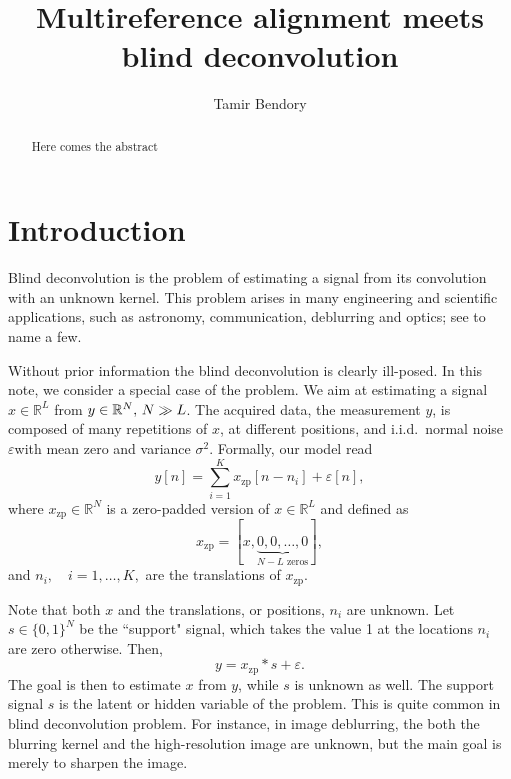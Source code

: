 \documentclass[12pt,a4paper]{article}
\numberwithin{equation}{section}
\numberwithin{figure}{section}
\theoremstyle{plain}
\theoremstyle{definition}
\theoremstyle{remark}
\theoremstyle{plain}
\theoremstyle{remark}
\theoremstyle{plain}
\theoremstyle{plain}
\newcommand{\RL}{\mathbb{R}^L}
\newcommand{\RN}{\mathbb{R}^N}
\newcommand{\xz}{x_{\textrm{zp}}}
\begin{document}


\title{Multireference alignment meets blind deconvolution}
\author{Tamir Bendory}
\maketitle

\begin{abstract}
	Here comes the abstract
\end{abstract}


\section{Introduction} \label{sec:introduction}

Blind deconvolution is the problem of estimating a signal from its convolution with an unknown kernel. This problem arises in many engineering and scientific applications, such as astronomy, communication, deblurring and optics; see   \cite{jefferies1993restoration,tong1994blind,chan1998total,campisi2016blind,kundur1996blind,levin2011understanding,shalvi1990new,levin2009understanding,krishnan2011blind,ayers1988iterative,michaeli2014blind} to name a few.

Without prior information the blind deconvolution is clearly ill-posed. In this note, we consider a special case of the problem. We aim at estimating a signal $x\in\RL$ from $y\in\RN, \thinspace N\gg L$. The acquired data, the measurement $y$, is composed of many repetitions of $x$, at different positions, and i.i.d.\ normal noise $\varepsilon $with mean zero and variance $\sigma^2$. 
Formally, our model read
\begin{equation}
y[n] = \sum_{i=1}^K \xz [n-n_i] + \varepsilon[n], 
\end{equation}
where $\xz\in\RN$ is a zero-padded version of $x\in\RL$ and 
defined as $$\xz  = [x, \underbrace{0,0,\ldots,0}_{N-L \text{ zeros}}],$$ and
 $n_i,\quad i=1,\ldots,K,$ are the translations of $\xz$.


Note that both $x$ and the translations, or positions, $n_i$ are unknown. Let $s\in\{0,1\}^N$ be the ``support" signal, which takes the value 1 at the locations $n_i$ are zero otherwise. 
Then, 
\begin{equation}
y = \xz \ast s + \varepsilon.
\end{equation}
The goal is then to estimate $x$ from $y$, while $s$ is unknown as well. The support signal $s$ is the latent or hidden variable of the problem. This is quite common in blind deconvolution problem. For instance, in image deblurring, the both the blurring kernel and the high-resolution image are unknown, but the main goal is merely to sharpen the image. 
\end{document}
